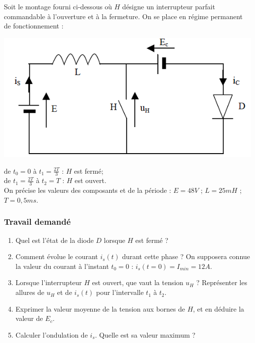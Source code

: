 
Soit le montage fourni ci-dessous où $H$ désigne un interrupteur parfait commandable à l’ouverture et à la fermeture. On se place en régime permanent de fonctionnement : 
\begin{center}
\includegraphics[scale=0.5]{png/hacheur2.png}
\end{center}
de $t_0=0$ à $t_1=\frac{2T}{3}$ : $H$ est fermé;\\
de $t_1=\frac{2T}{3}$ à $t_2=T$ : $H$ est ouvert.\\
On précise les valeurs des composants et de la période : $E=48V$ ; $L=25mH$ ; $T=0,5ms$.

\subsubsection{Travail demandé}
\begin{enumerate}
\item Quel est l’état de la diode $D$ lorsque $H$ est fermé ?
\item Comment évolue le courant $i_s(t)$ durant cette phase ? On supposera connue la valeur du courant à l’instant $t_0=0$ : $i_s(t=0)=I_{min}=12A$.
\item Lorsque l’interrupteur $H$ est ouvert, que vaut la tension $u_H$ ? Représenter les allures de $u_H$ et de $i_s(t)$ pour l’intervalle $t_1$ à $t_2$.
\item Exprimer la valeur moyenne de la tension aux bornes de $H$, et en déduire la valeur de $E_c$.
\item Calculer l’ondulation de $i_s$. Quelle est sa valeur maximum ?  
\end{enumerate}


